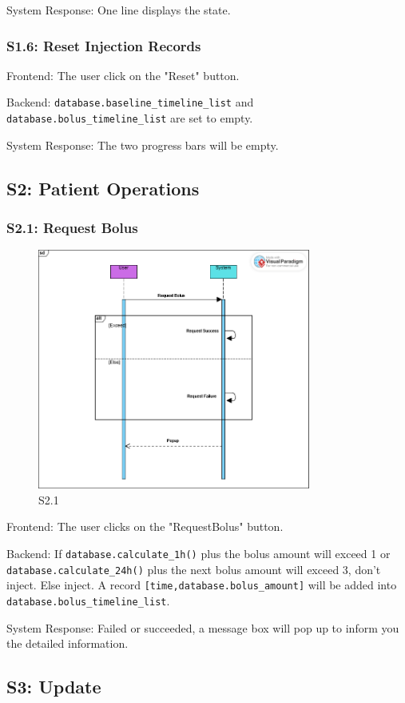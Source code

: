 \documentclass{article}
\begin{document}
System Response: One line displays the state.
\subsubsection*{S1.6: Reset Injection Records}
Frontend: The user click on the "Reset" button.

Backend: \lstinline!database.baseline_timeline_list! and \lstinline!database.bolus_timeline_list! are set to empty.

System Response: The two progress bars will be empty.
\subsection*{S2: Patient Operations}
\subsubsection*{S2.1: Request Bolus}
\begin{figure}[htbp]
  \centering
  \includegraphics[width=0.8\textwidth]{img/S2_1.png}
  \caption{S2.1}
\end{figure}
Frontend: The user clicks on the "RequestBolus" button.

Backend: If \lstinline!database.calculate_1h()! plus the bolus amount will exceed 1 or \lstinline!database.calculate_24h()! plus the next bolus amount will exceed 3, don't inject. Else inject. A record \lstinline![time,database.bolus_amount]! will be added into \lstinline!database.bolus_timeline_list!.

System Response: Failed or succeeded, a message box will pop up to inform you the detailed information.
\subsection*{S3: Update}
\end{document}
